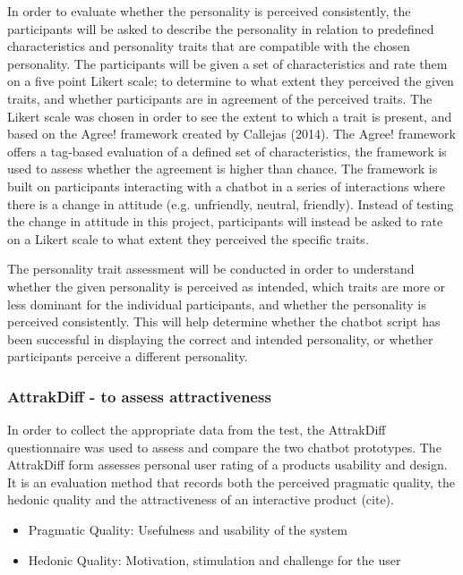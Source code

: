      In order to evaluate whether the personality is perceived consistently, the participants will be asked to describe the personality in relation to predefined characteristics and personality traits that are compatible with the chosen personality. The participants will be given a set of characteristics and rate them on a five point Likert scale; to determine to what extent they perceived the given traits, and whether participants are in agreement of the perceived traits. The Likert scale was chosen in order to see the extent to which a trait is present, and based on the Agree! framework created by Callejas (2014). The Agree! framework offers a tag-based evaluation of a defined set of characteristics, the framework is used to assess whether the agreement is higher than chance. The framework is built on participants interacting with a chatbot in a series of interactions where there is a change in attitude (e.g. unfriendly, neutral, friendly). Instead of testing the change in attitude in this project, participants will instead be asked to rate on a Likert scale to what extent they perceived the specific traits.
     
     The personality trait assessment will be conducted in order to understand whether the given personality is perceived as intended, which traits are more or less dominant for the individual participants, and whether the personality is perceived consistently. This will help determine whether the chatbot script has been successful in displaying the correct and intended personality, or whether participants perceive a different personality.
            
    \vspace{5mm} %
   
     \subsubsection{AttrakDiff - to assess attractiveness}
    
    In order to collect the appropriate data from the test, the AttrakDiff questionnaire was used to assess and compare the two chatbot prototypes. The AttrakDiff form assesses personal user rating of a products usability and design. It is an evaluation method that records both the perceived pragmatic quality, the hedonic quality and the attractiveness of an interactive product (cite).
    
        \begin{itemize}
            \item Pragmatic Quality: Usefulness and usability of the system
            \item Hedonic Quality: Motivation, stimulation and challenge for the user
        \end{itemize}
        
